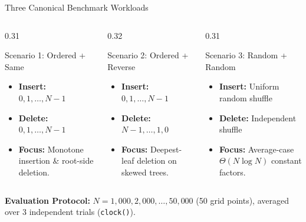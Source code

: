\documentclass[aspectratio=169, 10pt, xcolor={x11names}]{beamer}
\newcommand{\code}[1]{\texttt{\color{primary!90!black}#1}}
\begin{document}
\begin{frame}{Three Canonical Benchmark Workloads}
\vspace{0.2em}
\begin{columns}[T,onlytextwidth]
\begin{column}{0.31\textwidth}
\begin{block}{Scenario 1: Ordered + Same}
\begin{itemize}\setlength{\itemsep}{0.45em}\footnotesize
  \item \textbf{Insert:} $0, 1, \dots, N-1$
  \item \textbf{Delete:} $0, 1, \dots, N-1$
  \item \textbf{Focus:} Monotone insertion \& root-side deletion.
\end{itemize}
\end{block}
\end{column}

\begin{column}{0.32\textwidth}
\begin{alertblock}{Scenario 2: Ordered + Reverse}
\begin{itemize}\setlength{\itemsep}{0.45em}\footnotesize
  \item \textbf{Insert:} $0, 1, \dots, N-1$
  \item \textbf{Delete:} $N-1, \dots, 1, 0$
  \item \textbf{Focus:} Deepest-leaf deletion on skewed trees.
\end{itemize}
\end{alertblock}
\end{column}

\begin{column}{0.31\textwidth}
\begin{exampleblock}{Scenario 3: Random + Random}
\begin{itemize}\setlength{\itemsep}{0.45em}\footnotesize
  \item \textbf{Insert:} Uniform random shuffle
  \item \textbf{Delete:} Independent shuffle
  \item \textbf{Focus:} Average-case $\Theta(N\log N)$ constant factors.
\end{itemize}
\end{exampleblock}
\end{column}
\end{columns}

\vspace{0.8em}
\begin{center}
\footnotesize
\textbf{\color{primary}Evaluation Protocol:} $N = 1{,}000, 2{,}000, \dots, 50{,}000$ (50 grid points), averaged over $3$ independent trials (\code{clock()}).
\end{center}
\end{frame}
\end{document}

